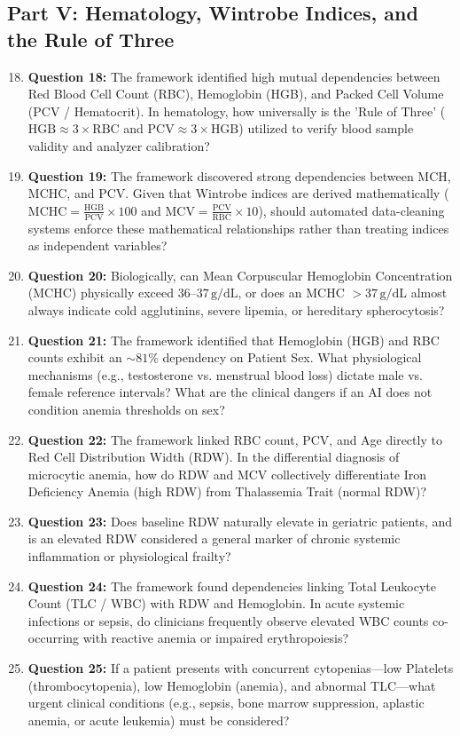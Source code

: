 \documentclass[MTech]{ugthesis}
\begin{document}
\begin{appendices}
\section*{Part V: Hematology, Wintrobe Indices, and the Rule of Three}
\begin{enumerate}\setcounter{enumi}{17}
    \item \textbf{Question 18:} The framework identified high mutual dependencies between Red Blood Cell Count (RBC), Hemoglobin (HGB), and Packed Cell Volume (PCV / Hematocrit). In hematology, how universally is the 'Rule of Three' ($\text{HGB} \approx 3 \times \text{RBC}$ and $\text{PCV} \approx 3 \times \text{HGB}$) utilized to verify blood sample validity and analyzer calibration?
    \item \textbf{Question 19:} The framework discovered strong dependencies between MCH, MCHC, and PCV. Given that Wintrobe indices are derived mathematically ($\text{MCHC} = \frac{\text{HGB}}{\text{PCV}} \times 100$ and $\text{MCV} = \frac{\text{PCV}}{\text{RBC}} \times 10$), should automated data-cleaning systems enforce these mathematical relationships rather than treating indices as independent variables?
    \item \textbf{Question 20:} Biologically, can Mean Corpuscular Hemoglobin Concentration (MCHC) physically exceed $36\text{--}37\,\text{g/dL}$, or does an MCHC $> 37\,\text{g/dL}$ almost always indicate cold agglutinins, severe lipemia, or hereditary spherocytosis?
    \item \textbf{Question 21:} The framework identified that Hemoglobin (HGB) and RBC counts exhibit an $\sim 81\%$ dependency on Patient Sex. What physiological mechanisms (e.g., testosterone vs. menstrual blood loss) dictate male vs. female reference intervals? What are the clinical dangers if an AI does not condition anemia thresholds on sex?
    \item \textbf{Question 22:} The framework linked RBC count, PCV, and Age directly to Red Cell Distribution Width (RDW). In the differential diagnosis of microcytic anemia, how do RDW and MCV collectively differentiate Iron Deficiency Anemia (high RDW) from Thalassemia Trait (normal RDW)?
    \item \textbf{Question 23:} Does baseline RDW naturally elevate in geriatric patients, and is an elevated RDW considered a general marker of chronic systemic inflammation or physiological frailty?
    \item \textbf{Question 24:} The framework found dependencies linking Total Leukocyte Count (TLC / WBC) with RDW and Hemoglobin. In acute systemic infections or sepsis, do clinicians frequently observe elevated WBC counts co-occurring with reactive anemia or impaired erythropoiesis?
    \item \textbf{Question 25:} If a patient presents with concurrent cytopenias---low Platelets (thrombocytopenia), low Hemoglobin (anemia), and abnormal TLC---what urgent clinical conditions (e.g., sepsis, bone marrow suppression, aplastic anemia, or acute leukemia) must be considered?
\end{enumerate}


\end{appendices}
\end{document}
